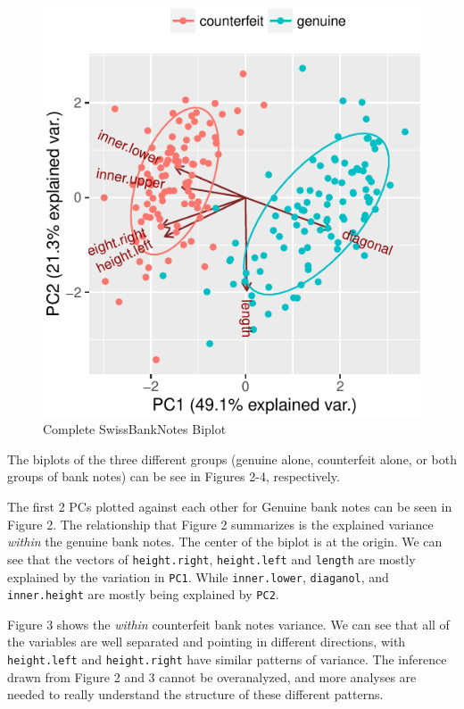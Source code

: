 \documentclass[]{article}
\begin{document}
\begin{figure}[htbp]
\centering
\includegraphics{sta546_hw2_files/figure-latex/unnamed-chunk-6-3.pdf}
\caption{Complete SwissBankNotes Biplot}
\end{figure}

The biplots of the three different groups (genuine alone, counterfeit
alone, or both groups of bank notes) can be see in Figures 2-4,
respectively.

The first 2 PCs plotted against each other for Genuine bank notes can be
seen in Figure 2. The relationship that Figure 2 summarizes is the
explained variance \emph{within} the genuine bank notes. The center of
the biplot is at the origin. We can see that the vectors of
\texttt{height.right}, \texttt{height.left} and \texttt{length} are
mostly explained by the variation in \texttt{PC1}. While
\texttt{inner.lower}, \texttt{diaganol}, and \texttt{inner.height} are
mostly being explained by \texttt{PC2}.

Figure 3 shows the \emph{within} counterfeit bank notes variance. We can
see that all of the variables are well separated and pointing in
different directions, with \texttt{height.left} and
\texttt{height.right} have similar patterns of variance. The inference
drawn from Figure 2 and 3 cannot be overanalyzed, and more analyses are
needed to really understand the structure of these different patterns.
\end{document}
